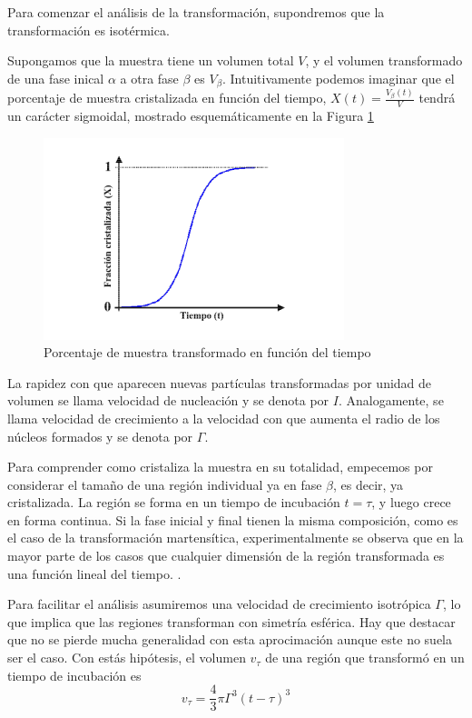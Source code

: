 \documentclass{article}
\theoremstyle{definition}
\theoremstyle{remark}
\begin{document}
Para comenzar el análisis de la transformación, supondremos que la transformación es isotérmica.

Supongamos que la muestra tiene un volumen total $V$, y el volumen transformado de una fase inical $\alpha$ a otra fase $\beta$ es $V_\beta$. Intuitivamente podemos imaginar que el porcentaje de muestra cristalizada en función del tiempo, $X(t) = \frac{V_\beta (t)}{V}$ tendrá un carácter sigmoidal, mostrado esquemáticamente en la Figura \ref{cvst}

 \begin{figure}[H]
 	\centering
	\includegraphics[scale=0.5]{img/cristalization_vs_tiempo.png}
 	\caption{Porcentaje de muestra transformado en función del tiempo}
	\label{cvst}
\end{figure} 

La rapidez con que aparecen nuevas partículas transformadas por unidad de volumen se llama velocidad de nucleación y se denota por $I$. Analogamente, se llama velocidad de crecimiento a la velocidad con que aumenta el radio de los núcleos formados y se denota por $\Gamma$.

Para comprender como cristaliza la muestra en su totalidad, empecemos por
considerar el tamaño de una región individual ya en fase $\beta$, es decir, ya cristalizada. La región se forma en un tiempo de incubación $t=\tau$, y luego crece en forma continua. Si la fase inicial y final tienen la misma composición, como es el caso de la transformación martensítica, experimentalmente se observa que en la mayor parte de los casos que cualquier dimensión de la región transformada es una función lineal del tiempo. .

Para facilitar el análisis asumiremos una velocidad de crecimiento isotrópica $\Gamma$, lo que implica que las regiones transforman con simetría esférica. Hay que destacar que no se pierde mucha generalidad con esta aprocimación aunque este no suela ser el caso. Con estás hipótesis, el volumen $v_\tau$ de una región que transformó en un tiempo de incubación es 
\begin{equation}
	v_\tau = \frac{4}{3}\pi \Gamma^3(t-\tau)^3
\end{equation}
\end{document}
